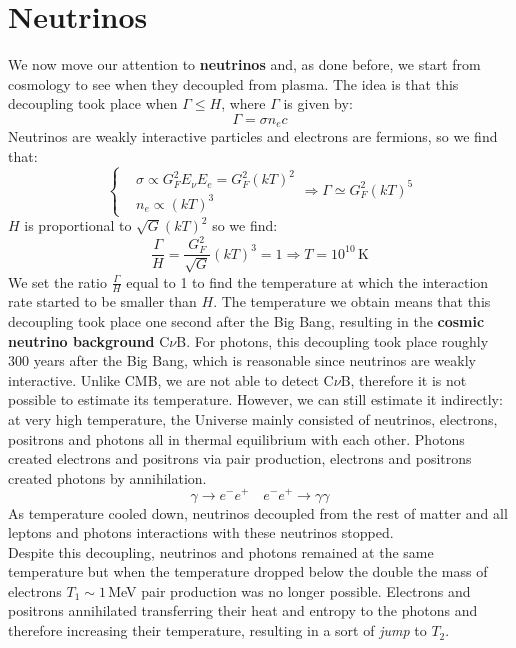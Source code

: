\documentclass[10.75pt,a4paper,openright,bottom=2cm]{article}
\begin{document}
\section{Neutrinos}
We now move our attention to \textbf{neutrinos} and, as done before, we start from cosmology to see when they decoupled from plasma. The idea is that this decoupling took place when $\Gamma\le H$, where $\Gamma$ is given by:
\[
\Gamma=\sigma n_ec
\]
Neutrinos are weakly interactive particles and electrons are fermions, so we find that:
\[
\left\{
\begin{aligned}
&\sigma\propto G_F^2E_\nu E_e=G_F^2(kT)^2\\
&n_e\propto(kT)^3
\end{aligned}
\right.
\Rightarrow\Gamma\simeq G_F^2(kT)^5
\]
$H$ is proportional to $\sqrt{G}(kT)^2$ so we find:
\[
\frac{\Gamma}{H}=\frac{G_F^2}{\sqrt{G}}(kT)^3=1\Rightarrow T=10^{10}\,\text{K}
\]
We set the ratio $\frac{\Gamma}{H}$ equal to 1 to find the temperature at which the interaction rate started to be smaller than $H$. The temperature we obtain means that this decoupling took place one second after the Big Bang, resulting in the \textbf{cosmic neutrino background} C$\nu$B. For photons, this decoupling took place roughly 300 years after the Big Bang, which is reasonable since neutrinos are weakly interactive. Unlike CMB, we are not able to detect C$\nu$B, therefore it is not possible to estimate its temperature. However, we can still estimate it indirectly: at very high temperature, the Universe mainly consisted of neutrinos, electrons, positrons and photons all in thermal equilibrium with each other. Photons created electrons and positrons via pair production, electrons and positrons created photons by annihilation.
\[
\gamma\to e^-e^+ \quad e^-e^+\to\gamma\gamma
\]
As temperature cooled down, neutrinos decoupled from the rest of matter and all leptons and photons interactions with these neutrinos stopped.\\
Despite this decoupling, neutrinos and photons remained at the same temperature but when the temperature dropped below the double the mass of electrons $T_1\sim1$\,MeV pair production was no longer possible. Electrons and positrons annihilated transferring their heat and entropy to the photons and therefore increasing their temperature, resulting in a sort of \textit{jump} to $T_2$.
\end{document}
